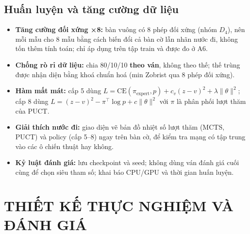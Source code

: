 \documentclass[12pt,a4paper]{report}
\newenvironment{gon}{\begin{itemize}\setlength{\itemsep}{2pt}\setlength{\parskip}{0pt}}{\end{itemize}}
\begin{document}
\subsection{Huấn luyện và tăng cường dữ liệu}
\begin{gon}
  \item \textbf{Tăng cường đối xứng ×8:} bàn vuông có 8 phép đối xứng (nhóm $D_4$), nên mỗi mẫu cho 8 mẫu bằng cách biến đổi cả bàn cờ lẫn nhãn nước đi, không tốn thêm tính toán; chỉ áp dụng trên tập train và được đo ở A6.
  \item \textbf{Chống rò rỉ dữ liệu:} chia 80/10/10 \textbf{theo ván}, không theo thế; thế trùng được nhận diện bằng khoá chuẩn hoá (min Zobrist qua 8 phép đối xứng).
  \item \textbf{Hàm mất mát:} cấp 5 dùng $L = \text{CE}(\pi_{\text{expert}}, p) + c_v (z - v)^2 + \lambda \|\theta\|^2$; cấp 8 dùng $L = (z - v)^2 - \pi^{\top} \log p + c \|\theta\|^2$ với $\pi$ là phân phối lượt thăm của PUCT.
  \item \textbf{Giải thích nước đi:} giao diện vẽ bản đồ nhiệt số lượt thăm (MCTS, PUCT) và policy (cấp 5--8) ngay trên bàn cờ, để kiểm tra mạng có tập trung vào các ô chiến thuật hay không.
  \item \textbf{Kỷ luật đánh giá:} lưu checkpoint và seed; không dùng ván đánh giá cuối cùng để chọn siêu tham số; khai báo CPU/GPU và thời gian huấn luyện.
\end{gon}

\section{THIẾT KẾ THỰC NGHIỆM VÀ ĐÁNH GIÁ}
\end{document}
